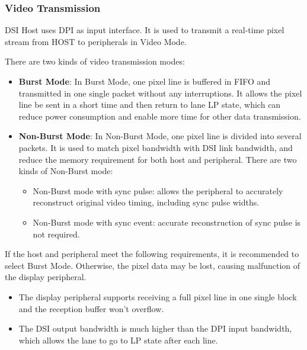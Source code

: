 \documentclass[main\_\_EN.tex]{subfiles}
\begin{document}
\subsubsection{Video Transmission}
DSI Host uses DPI as input interface. It is used to transmit a real-time pixel stream from HOST to peripherals in Video Mode.

There are two kinds of video transmission modes:
\begin{itemize}
    \item \textbf{Burst Mode}: In Burst Mode, one pixel line is buffered in FIFO and transmitted in one single packet without any interruptions. It allows the pixel line be sent in a short time and then return to lane LP state, which can reduce power consumption and enable more time for other data transmission.
    \item \textbf{Non-Burst Mode}: In Non-Burst Mode, one pixel line is divided into several packets. It is used to match pixel bandwidth with DSI link bandwidth, and reduce the memory requirement for both host and peripheral. There are two kinds of Non-Burst mode:
    \begin{itemize}
        \item Non-Burst mode with sync pulse: allows the peripheral to accurately reconstruct original video timing, including sync pulse widths.
        \item Non-Burst mode with sync event: accurate reconstruction of sync pulse is not required.
    \end{itemize}
\end{itemize}

If the host and peripheral meet the following requirements, it is recommended to select Burst Mode. Otherwise, the pixel data may be lost, causing malfunction of the display peripheral.
\begin{itemize}
    \item The display peripheral supports receiving a full pixel line in one single block and the reception buffer won't overflow.
    \item The DSI output bandwidth is much higher than the DPI input bandwidth, which allows the lane to go to LP state after each line.
\end{itemize}
\end{document}
